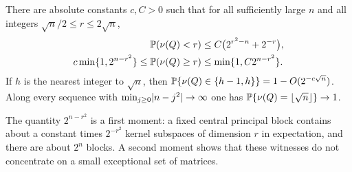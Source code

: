 \begin{theorem}\label{spn:thm:threshold}
There are absolute constants $c,C>0$ such that for all sufficiently large $n$ and all integers
$\sqrt n/2\le r\le2\sqrt n$,
\begin{align}
 \mathbb{P}(\nu(Q)<r)&\le C\bigl(2^{r^2-n}+2^{-r}\bigr),\label{spn:eq:fail}\\
 c\min\{1,2^{n-r^2}\}\le\mathbb{P}(\nu(Q)\ge r)&\le\min\{1,C2^{n-r^2}\}.\label{spn:eq:hit}
\end{align}
If $h$ is the nearest integer to $\sqrt n$, then
$\mathbb{P}\{\nu(Q)\in\{h-1,h\}\}=1-O(2^{-c\sqrt n})$. Along every sequence with
$\min_{j\ge0}\lvert n-j^2\rvert\to\infty$ one has $\mathbb{P}\{\nu(Q)=\lfloor\sqrt n\rfloor\}\to1$.
\end{theorem}

The quantity $2^{n-r^2}$ is a first moment: a fixed central principal block contains about a
constant times $2^{-r^2}$ kernel subspaces of dimension $r$ in expectation, and there are about
$2^n$ blocks. A second moment shows that these witnesses do not concentrate on a small
exceptional set of matrices.

